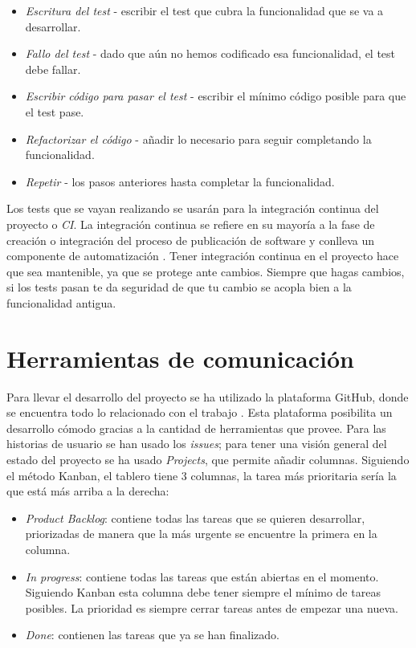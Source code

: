 \begin{itemize}
    \item \textit{Escritura del test} - escribir el test que cubra la funcionalidad que se va a desarrollar.
    \item \textit{Fallo del test} - dado que aún no hemos codificado esa funcionalidad, el test debe fallar.
    \item \textit{Escribir código para pasar el test} - escribir el mínimo código posible para que el test pase.
    \item \textit{Refactorizar el código} - añadir lo necesario para seguir completando la funcionalidad.
    \item \textit{Repetir} - los pasos anteriores hasta completar la funcionalidad.
\end{itemize}

Los tests que se vayan realizando se usarán para la integración continua del proyecto o \emph{CI}.
La integración continua se refiere en su mayoría a la fase de creación o integración del proceso de publicación de
software y conlleva un componente de automatización \cite{CI}. Tener integración continua en el proyecto hace que sea
mantenible, ya que se protege ante cambios. Siempre que hagas cambios, si los tests pasan te da seguridad de que tu cambio se 
acopla bien a la funcionalidad antigua. 


\section{Herramientas de comunicación}

Para llevar el desarrollo del proyecto se ha utilizado la plataforma GitHub, donde se encuentra todo lo 
relacionado con el trabajo \cite{project_repository}. Esta plataforma posibilita un desarrollo cómodo gracias a la cantidad
de herramientas que provee. Para las historias de usuario se han usado los \textit{issues}; para tener una
visión general del estado del proyecto se ha usado \textit{Projects}, que permite añadir columnas. Siguiendo el método Kanban, el
tablero tiene 3 columnas, la tarea más prioritaria sería la que está más arriba a la derecha:

\begin{itemize}
    \item \emph{Product Backlog}: contiene todas las tareas que se quieren desarrollar, priorizadas de manera que la más urgente
    se encuentre la primera en la columna.
    \item \emph{In progress}: contiene todas las tareas que están abiertas en el momento. Siguiendo Kanban esta columna
    debe tener siempre el mínimo de tareas posibles. La prioridad es siempre cerrar tareas antes de empezar una nueva.
    \item \emph{Done}: contienen las tareas que ya se han finalizado.
\end{itemize}

